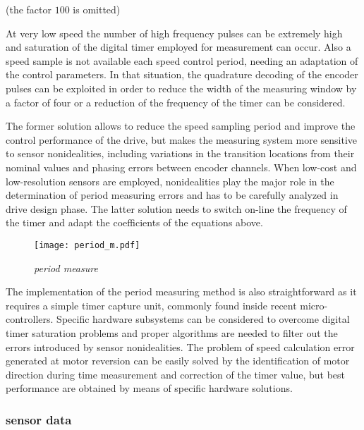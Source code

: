 (the factor $100$ is omitted)

At very low speed the number of high frequency pulses can be extremely high and %
{saturation} of the digital timer
employed for measurement can occur. Also a speed sample is not available each speed control period, needing an adaptation of the control parameters. In that situation, the quadrature decoding of the encoder pulses can be exploited in order to reduce the width of the measuring window by a factor of four or a reduction of the frequency of the timer can be considered.

The former solution allows to reduce the speed sampling period and improve the control performance of the drive, but makes the measuring system more sensitive to sensor
nonidealities, including variations in the transition locations
from their nominal values and phasing errors between encoder
channels. When low-cost and low-resolution sensors are
employed, nonidealities play the major role in the
determination of period measuring errors and has to be
carefully analyzed in drive design phase. The latter solution
needs to switch on-line the frequency of the timer and adapt the
coefficients of the equations above.
\begin{figure}[ht!]
\centerline{
\texttt{[image: period\_m.pdf]}
}
\caption{\emph{period measure}}
\label {fig:periodenc}
\end{figure}

The implementation of the period measuring method is also
straightforward as it requires a simple timer capture unit,
commonly found inside recent micro-controllers. Specific
hardware subsystems can be considered to overcome digital
timer saturation problems and proper
algorithms are needed to filter out the errors introduced by
sensor nonidealities. The problem of speed
calculation error generated at motor reversion can be easily
solved by the identification of motor direction during time
measurement and correction of the timer value, but best
performance are obtained by means of specific hardware
solutions.




\subsubsection{sensor data}
